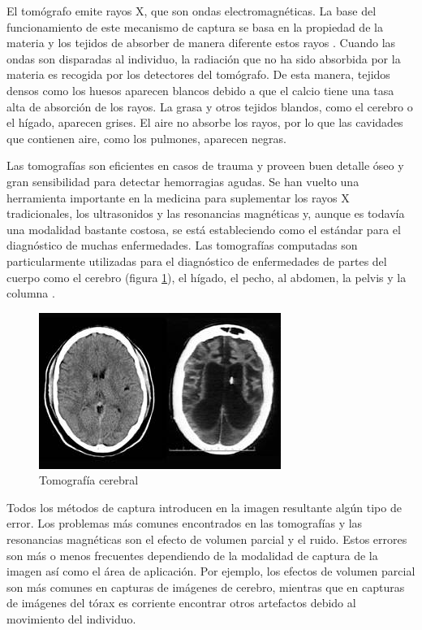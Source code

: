 El tomógrafo emite rayos X, que son ondas electromagnéticas. La base del funcionamiento de este mecanismo de captura se basa en la propiedad de la materia y los tejidos de absorber de manera diferente estos rayos \citep{prince2006medical}.
Cuando las ondas son disparadas al individuo, la radiación que no ha sido absorbida por la materia es recogida por los detectores del tomógrafo. De esta manera, tejidos densos como los huesos aparecen blancos debido a que el calcio tiene una tasa alta de absorción de los rayos. La grasa y otros tejidos blandos, como el cerebro o el hígado, aparecen grises. El aire no absorbe los rayos, por lo que las cavidades que contienen aire, como los pulmones, aparecen negras.

Las tomografías son eficientes en casos de trauma y proveen buen detalle óseo y gran sensibilidad para detectar hemorragias agudas. Se han vuelto una herramienta importante en la medicina para suplementar los rayos X tradicionales, los ultrasonidos y las resonancias magnéticas y, aunque es todavía una modalidad bastante costosa, se está estableciendo como el estándar para el diagnóstico de muchas enfermedades. Las tomografías computadas son particularmente utilizadas para el diagnóstico de enfermedades de partes del cuerpo como el cerebro (figura \ref{fig:tomografia_cerebral}), el hígado, el pecho, al abdomen, la pelvis y la columna \citep{sharma2010automated}.

\begin{figure}[H]
\centering
\includegraphics[scale=1]{images/Schiavo_catscan.jpg}
\caption{Tomografía cerebral}
\label{fig:tomografia_cerebral}
\end{figure}

Todos los métodos de captura introducen en la imagen resultante algún tipo de error. Los problemas más comunes encontrados en las tomografías y las resonancias magnéticas son el efecto de volumen parcial y el ruido. Estos errores son más o menos frecuentes dependiendo de la modalidad de captura de la imagen así como el área de aplicación. Por ejemplo, los efectos de volumen parcial son más comunes en capturas de imágenes de cerebro, mientras que en capturas de imágenes del tórax es corriente encontrar otros artefactos debido al movimiento del individuo.

